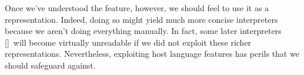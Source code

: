 Once we’ve understood the feature, however, we should feel to use it as a
representation. Indeed, doing so might yield much more concise interpreters
because we aren’t doing everything manually. In fact, some later interpreters
\ref{}\ will become virtually unreadable if we did not exploit these richer
representations. Nevertheless, exploiting host language features has perils that
we should safeguard against.
